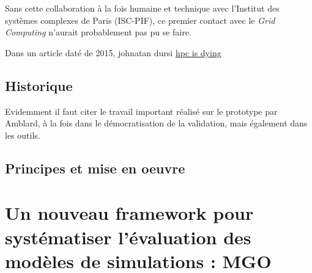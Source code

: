 Sans cette collaboration à la fois humaine et technique avec l'Institut des systèmes complexes de Paris (ISC-PIF), ce premier contact avec le \textit{Grid Computing} n'aurait probablement pas pu se faire.


Dans un article daté de 2015, johnatan dursi
\href{http://www.dursi.ca/hpc-is-dying-and-mpi-is-killing-it/}{hpc is dying}

\subsection{Historique}

Evidemment il faut citer le travail important réalisé sur le prototype par Amblard, à la fois dans le démocratisation de la validation, mais également dans les outils.

\subsection{Principes et mise en oeuvre}

\section{Un nouveau framework pour systématiser l'évaluation des modèles de simulations : MGO}
\label{sec:MGO}



